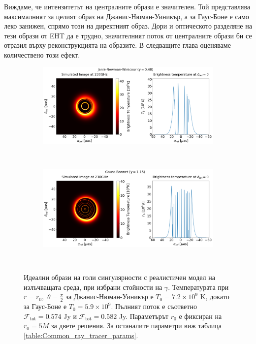 \noindent Виждаме, че интензитетът на централните образи е значителен. Той представлява максималният за целият образ на Джанис-Нюман-Уиникър, а за Гаус-Боне е само леко занижен, спрямо този на директният образ. Дори и оптическото разделяне на тези образи от EHT да е трудно, значителният поток от централните образи би се отразил върху реконструкцията на образите. В следващите глава оценяваме количествено този ефект.
\newpage

\begin{figure}[h!]
	\centering
	\begin{subfigure}{12cm}
		\hspace{-1cm}
		\includegraphics[scale = 0.3]{Ray_tracer_plot_230_JNW.png}
	\end{subfigure}\\
	\begin{subfigure}{12cm}
		\hspace{-1cm}
		\includegraphics[scale = 0.3]{Ray_tracer_plot_230_GB.png}
	\end{subfigure}\\
	\label{Naked_Singularity_Ray_tracer_230}
	\caption[Идеални образи на голи сингулярности с реалистичен модел на излъчващата среда, при избрани стойности на $\gamma$.]{Идеални образи на голи сингулярности с реалистичен модел на излъчващата среда, при избрани стойности на $\gamma$. Температурата при $r = r_0,\,\,\theta = \frac{\pi}{2}$ за Джанис-Нюман-Уиникър е $T_0 = 7.2\times10^9$ K, докато за Гаус-Боне е $T_0 = 5.9\times10^9$. Пълният поток е съответно $\mathcal{F}_{\text{tot}} = 0.574$ Jy и $\mathcal{F}_{\text{tot}} = 0.582$ Jy. Параметърът $r_0$ е фиксиран на $r_0 = 5M$ за двете решения. За останалите параметри виж таблица \ref{table:Common_ray_tracer_params}.} 
\end{figure}


